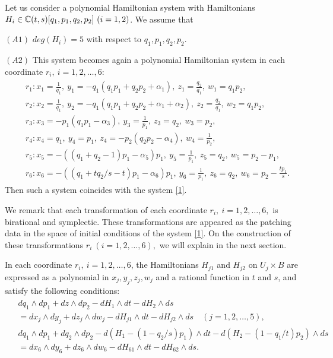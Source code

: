 \begin{thm}\label{th;holoG}
Let us consider a polynomial Hamiltonian system with Hamiltonians $H_i \in {\Bbb C}(t,s)[q_1,p_1,q_2,p_2] \ (i=1,2)$. We assume that

$(A1)$ $deg(H_i)=5$ with respect to $q_1,p_1,q_2,p_2$.

$(A2)$ This system becomes again a polynomial Hamiltonian system in each coordinate $r_i, \ i=1,2,\dots,6${\rm:\rm}
\begin{align}
\begin{split}
&r_1:x_1=\frac{1}{q_1}, \ y_1=-q_1(q_1p_1+q_2p_2+\alpha_1), \ z_1=\frac{q_2}{q_1}, \ w_1=q_1p_2, \\
&r_2:x_2=\frac{1}{q_1}, \ y_2=-q_1(q_1p_1+q_2p_2+\alpha_1+\alpha_2), \ z_2=\frac{q_2}{q_1}, \ w_2=q_1p_2, \\
&r_3:x_3=-p_1(q_1p_1-\alpha_3),\ y_3=\frac{1}{p_1},\ z_3=q_2,\ w_3=p_2, \\
&r_4:x_4=q_1, \ y_4=p_1, \ z_4=-p_2(q_2p_2-\alpha_4), \ w_4=\frac{1}{p_2}, \\
&r_5:x_5=-((q_1+q_2-1)p_1-\alpha_5)p_1, \ y_5=\frac{1}{p_1}, \  z_5=q_2, \ w_5=p_2-p_1, \\
&r_6:x_6=-((q_1+tq_2/s-t)p_1-\alpha_6)p_1,\ y_6=\frac{1}{p_1}, \ z_6=q_2, \  w_6=p_2-\frac{tp_1}{s}.
\end{split}
\end{align}
Then such a system coincides with the system \eqref{1}.
\end{thm}
We remark that each transformation of each coordinate $r_i, \ i=1,2,\dots,6,$ is birational and symplectic. These transformations are appeared as the patching data in the space of initial conditions of the system \eqref{1}. On the construction of these transformations $r_i \ (i=1,2,\dots,6),$ we will explain in the next section.


\begin{prop} 
In each coordinate $r_i, \ i=1,2,\dots,6$, the  Hamiltonians $H_{j1}$ and $H_{j2}$ on $U_j \times B$ are expressed as a polynomial in $x_j,y_j,z_j,w_j$ and a rational function in $t$ and $s$, and satisfy the following conditions{\rm: \rm}
\begin{align}\label{symplectic}
\begin{split}
&dq_1 \wedge dp_1 +dz \wedge dp_2 - dH_1 \wedge dt- dH_2 \wedge ds\\
&=dx_j \wedge dy_j +dz_j \wedge dw_j - dH_{j1} \wedge dt- dH_{j2} \wedge ds \quad (j=1,2,\dots,5),\\
&dq_1 \wedge dp_1 +dq_2 \wedge dp_2 - d(H_1-(1-q_2/s)p_1) \wedge dt- d(H_2-(1-q_1/t)p_2) \wedge ds\\
&=dx_6 \wedge dy_6 +dz_6 \wedge dw_6 - dH_{61} \wedge dt- dH_{62} \wedge ds.
\end{split}
\end{align}
\end{prop}

